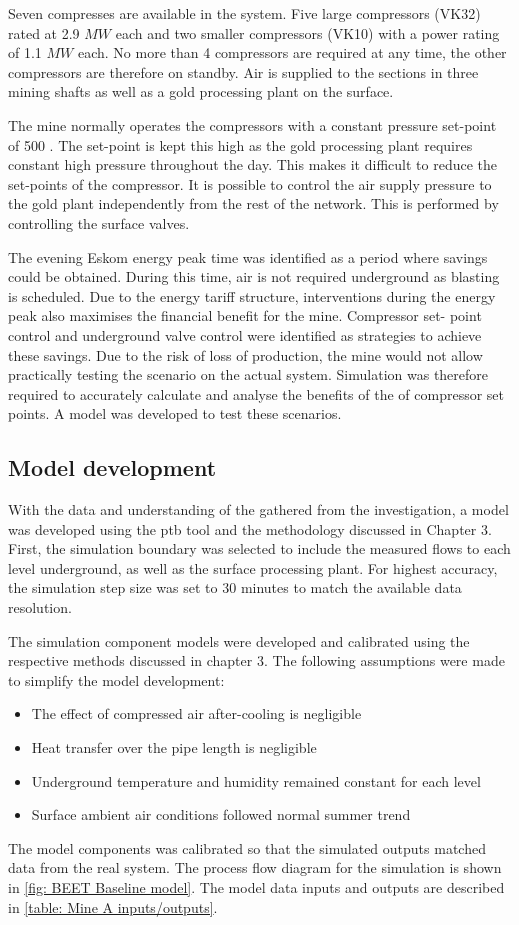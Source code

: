 \par 
 Seven compresses are available in the system. Five large compressors (VK32) rated at 2.9 $MW$ each and two smaller compressors (VK10) with a power rating of 1.1 $MW$ each. No more than 4 compressors are required at any time, the other compressors are therefore on standby. Air is supplied to the sections in three mining shafts as well as a gold processing plant on the surface. 
 \par 
 The mine normally operates the compressors with a constant pressure set-point of 500 . The set-point is kept this high as the gold processing plant requires constant high pressure throughout the day. This makes it difficult to reduce the set-points of the compressor. It is possible to control the air supply pressure to the gold plant independently from the rest of the network. This is performed by controlling the surface valves.
 \par 
  The evening Eskom energy peak time was identified as a period where savings could be obtained. During this time, air is not required underground as blasting is scheduled. Due to the energy tariff structure, interventions during the energy peak also maximises the financial benefit for the mine. Compressor set- point control and underground valve control were identified as strategies to achieve these savings. Due to the risk of loss of production, the mine would not allow practically testing the scenario on the actual system. Simulation was therefore required to accurately calculate and analyse the benefits of the of compressor set points. A model was developed to test these scenarios.

\subsection{Model development}
With the data and understanding of the gathered from the investigation, a model was developed using the \gls{ptb} tool and the methodology discussed in Chapter 3. First, the simulation boundary was selected to include the measured flows to each level underground, as well as the surface processing plant. For highest accuracy, the simulation step size was set to 30 minutes to match the available data resolution.
\par
The simulation component models were developed and calibrated using the respective methods discussed in chapter 3. The following assumptions were made to simplify the model development:
\begin{itemize}
	\item The effect of compressed air after-cooling is negligible
	\item Heat transfer over the pipe length is negligible
	\item Underground temperature and humidity remained constant for each level
	\item Surface ambient air conditions followed normal summer trend
\end{itemize} 
The model components was calibrated so that the simulated outputs matched data from the real system. The process flow diagram for the simulation is shown in \cref{fig: BEET Baseline model}. The model data inputs and outputs are described in \cref{table: Mine A inputs/outputs}.

